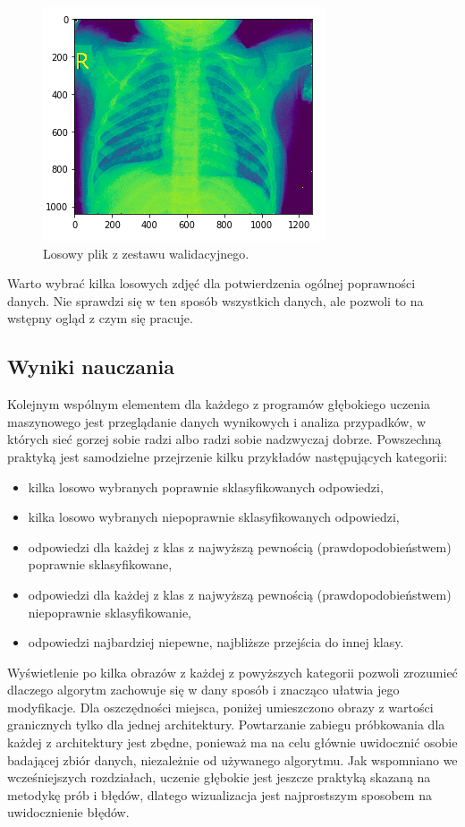 \documentclass[12pt,a4paper,twoside,titlepage,openright]{book}
\begin{document}
\begin{figure}[ht]
	\centering
			\includegraphics[resolution=100, scale=0.7]{ExampleLungImage.png}
		\caption{Losowy plik z zestawu walidacyjnego.}
\end{figure}

Warto wybrać kilka losowych zdjęć dla potwierdzenia ogólnej poprawności danych. Nie sprawdzi się w ten sposób wszystkich danych, ale pozwoli to na wstępny ogląd z czym się pracuje.

\subsection{Wyniki nauczania}
Kolejnym wspólnym elementem dla każdego z programów głębokiego uczenia maszynowego jest przeglądanie danych wynikowych i analiza przypadków, w których sieć gorzej sobie radzi albo radzi sobie nadzwyczaj dobrze. Powszechną praktyką jest samodzielne przejrzenie kilku przykładów następujących kategorii:
\begin{itemize}
\item kilka losowo wybranych poprawnie sklasyfikowanych odpowiedzi,
\item kilka losowo wybranych niepoprawnie sklasyfikowanych odpowiedzi,
\item odpowiedzi dla każdej z klas z najwyższą pewnością (prawdopodobieństwem) poprawnie sklasyfikowane,
\item odpowiedzi dla każdej z klas z najwyższą pewnością (prawdopodobieństwem) niepoprawnie sklasyfikowanie,
\item odpowiedzi najbardziej niepewne, najbliższe przejścia do innej klasy.
\end{itemize}

Wyświetlenie po kilka obrazów z każdej z powyższych kategorii pozwoli zrozumieć dlaczego algorytm zachowuje się w dany sposób i znacząco ułatwia jego modyfikacje. Dla oszczędności miejsca, poniżej umieszczono obrazy z wartości granicznych tylko dla jednej architektury. Powtarzanie zabiegu próbkowania dla każdej z architektury jest zbędne, ponieważ ma na celu głównie uwidocznić osobie badającej zbiór danych, niezależnie od używanego algorytmu. Jak wspomniano we wcześniejszych rozdziałach, uczenie głębokie jest jeszcze praktyką skazaną na metodykę prób i błędów, dlatego wizualizacja jest najprostszym sposobem na uwidocznienie błędów.
\end{document}
